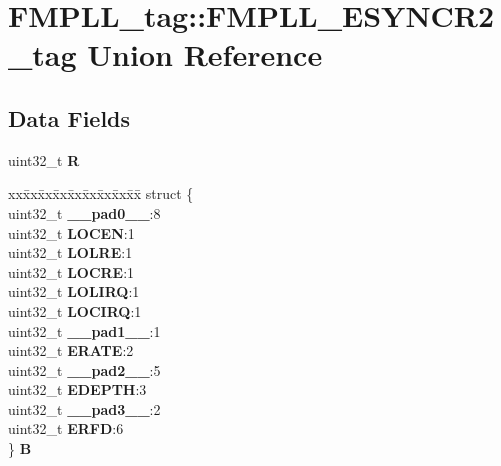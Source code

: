 \hypertarget{unionFMPLL__tag_1_1FMPLL__ESYNCR2__tag}{}\section{F\+M\+P\+L\+L\+\_\+tag\+::F\+M\+P\+L\+L\+\_\+\+E\+S\+Y\+N\+C\+R2\+\_\+tag Union Reference}
\label{unionFMPLL__tag_1_1FMPLL__ESYNCR2__tag}
\subsection*{Data Fields}
\begin{DoxyCompactItemize}
\item 
\mbox{\label{unionFMPLL__tag_1_1FMPLL__ESYNCR2__tag_a1b41757c909c27b1e51593946e643d50}} 
uint32\+\_\+t {\bfseries R}
\item 
\mbox{\label{unionFMPLL__tag_1_1FMPLL__ESYNCR2__tag_aabf7b277042c80ef2079f4369eb1ecc8}} 
\begin{tabbing}
xx\=xx\=xx\=xx\=xx\=xx\=xx\=xx\=xx\=\kill
struct \{\\
\>uint32\_t {\bfseries \_\_pad0\_\_}:8\\
\>uint32\_t {\bfseries LOCEN}:1\\
\>uint32\_t {\bfseries LOLRE}:1\\
\>uint32\_t {\bfseries LOCRE}:1\\
\>uint32\_t {\bfseries LOLIRQ}:1\\
\>uint32\_t {\bfseries LOCIRQ}:1\\
\>uint32\_t {\bfseries \_\_pad1\_\_}:1\\
\>uint32\_t {\bfseries ERATE}:2\\
\>uint32\_t {\bfseries \_\_pad2\_\_}:5\\
\>uint32\_t {\bfseries EDEPTH}:3\\
\>uint32\_t {\bfseries \_\_pad3\_\_}:2\\
\>uint32\_t {\bfseries ERFD}:6\\
\} {\bfseries B}\\


\end{tabbing}
\end{DoxyCompactItemize}
